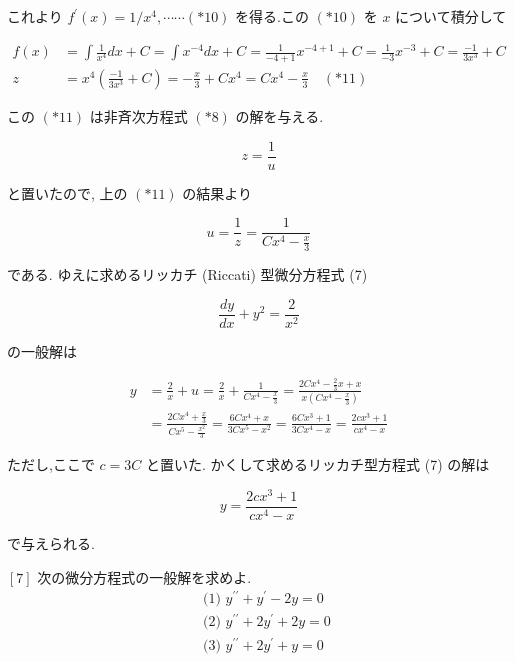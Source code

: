\documentclass[10pt]{jsarticle}
\begin{document}
これより $f^{\prime}(x)=1 / x^{4}, \cdots \cdots(* 10)$ を得る.この $(* 10)$ を $x$ について積分して


\begin{align*}
f(x) & =\int \frac{1}{x^{4}} d x+C=\int x^{-4} d x+C=\frac{1}{-4+1} x^{-4+1}+C=\frac{1}{-3} x^{-3}+C=\frac{-1}{3 x^{3}}+C \\
z & =x^{4}\left(\frac{-1}{3 x^{3}}+C\right)=-\frac{x}{3}+C x^{4}=C x^{4}-\frac{x}{3} \quad(* 11) \tag{*11}
\end{align*}


この $(* 11)$ は非斉次方程式 $(* 8)$ の解を与える.


\begin{equation*}
z=\frac{1}{u} \tag{*7}
\end{equation*}


と置いたので, 上の $(* 11)$ の結果より


\begin{equation*}
u=\frac{1}{z}=\frac{1}{C x^{4}-\frac{x}{3}} \tag{*12}
\end{equation*}


である. ゆえに求めるリッカチ (Riccati) 型微分方程式 (7)

$$
\frac{d y}{d x}+y^{2}=\frac{2}{x^{2}}
$$

の一般解は

$$
\begin{aligned}
y & =\frac{2}{x}+u=\frac{2}{x}+\frac{1}{C x^{4}-\frac{x}{3}}=\frac{2 C x^{4}-\frac{2}{3} x+x}{x\left(C x^{4}-\frac{x}{3}\right)} \\
& =\frac{2 C x^{4}+\frac{x}{3}}{C x^{5}-\frac{x^{2}}{3}}=\frac{6 C x^{4}+x}{3 C x^{5}-x^{2}}=\frac{6 C x^{3}+1}{3 C x^{4}-x}=\frac{2 c x^{3}+1}{c x^{4}-x}
\end{aligned}
$$

ただし,ここで $c=3 C$ と置いた. かくして求めるリッカチ型方程式 (7) の解は


\begin{equation*}
y=\frac{2 c x^{3}+1}{c x^{4}-x} \tag{*13}
\end{equation*}


で与えられる.

\bigskip
\bigskip
\bigskip
\bigskip
\bigskip
\bigskip
\bigskip

\begin{itembox}[l]{$[7]$ 次の微分方程式の一般解を求めよ.}
\begin{align*}
& \text { (1) } y^{\prime \prime}+y^{\prime}-2 y=0  \tag{8}\\
& \text { (2) } y^{\prime \prime}+2 y^{\prime}+2 y=0  \tag{9}\\
& \text { (3) } y^{\prime \prime}+2 y^{\prime}+y=0 \tag{10}
\end{align*}  
\end{itembox}
\end{document}
